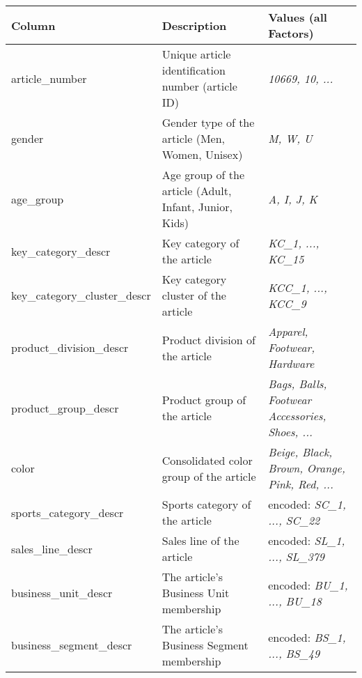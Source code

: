 \begin{table}[H]
\setlength\arrayrulewidth{1pt}  
\centering
\begin{adjustbox}{max width=\textwidth}
\begin{tabular}{|l|l|l|}
\hline
\rowcolor{Gray}
\textbf{Column}           & \textbf{Description}                                   & \textbf{Values (all Factors)}                 \\ \hline
article\_number           & Unique article identification number (article ID)      & \textit{10669, 10, ...}                                \\ \hline
gender                    & Gender type of the article (Men, Women, Unisex)        & \textit{M, W, U}                                       \\ \hline
age\_group                & Age group of the article (Adult, Infant, Junior, Kids) & \textit{A, I, J, K}                                    \\ \hline
key\_category\_descr      & Key category of the article & \textit{KC\_1, ..., KC\_15}   \\ \hline
key\_category\_cluster\_descr      & Key category cluster of the article & \textit{KCC\_1, ..., KCC\_9}   \\ \hline
product\_division\_descr  & Product division of the article                        & \textit{Apparel, Footwear, Hardware}                   \\ \hline
product\_group\_descr     & Product group of the article                           & \textit{Bags, Balls, Footwear Accessories, Shoes, ...} \\ \hline
color                     & Consolidated color group of the article                & \textit{Beige, Black, Brown, Orange, Pink, Red, ... }  \\ \hline
sports\_category\_descr   & Sports category of the article                         & encoded: \textit{SC\_1, ..., SC\_22 }                  \\ \hline
sales\_line\_descr        & Sales line of the article                              & encoded: \textit{SL\_1, ..., SL\_379 }                 \\ \hline
business\_unit\_descr     & The article's Business Unit membership                 & encoded:\textit{ BU\_1, ..., BU\_18   }                \\ \hline
business\_segment\_descr  & The article's Business Segment membership              & encoded: \textit{BS\_1, ..., BS\_49  }                 \\ \hline

\end{tabular}
\end{adjustbox}
\end{table}
